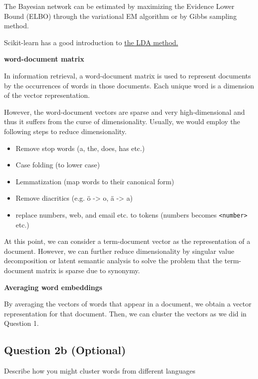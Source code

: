 \documentclass{kthreport}
\begin{document}
The Bayesian network can be estimated by maximizing the Evidence Lower Bound
(ELBO) through the variational EM algorithm or by Gibbs sampling method.

Scikit-learn has a good introduction to
\href{https://scikit-learn.org/stable/modules/decomposition.html#latentdirichletallocation}{the LDA method.}

\textbf{word-document matrix}

In information retrieval, a word-document matrix is used
to represent documents by the occurrences of words in those documents.
Each unique word is a dimension of the vector representation.

However, the word-document vectors are sparse and very high-dimensional and thus
it suffers from the curse of dimensionality.
Usually, we would employ the following steps to reduce dimensionality.

\begin{itemize}
    \item Remove stop words (a, the, does, has etc.)
    \item Case folding (to lower case)
    \item Lemmatization (map words to their canonical form)
    \item Remove diacritics (e.g. ö -> o, ä -> a)
    \item replace numbers, web, and email etc. to tokens (numbers becomes \texttt{<number>} etc.)
\end{itemize}

At this point, we can consider a term-document vector as the representation of a document.
However, we can further reduce dimensionality by singular value decomposition
or latent semantic analysis to solve the problem that the term-document matrix
is sparse due to synonymy.

\textbf{Averaging word embeddings}

By averaging the vectors of words that appear in a document, we obtain a vector
representation for that document. Then, we can cluster the vectors as we did in Question 1.

\subsection{Question 2b (Optional)}
Describe how you might cluster words from different languages
\end{document}

